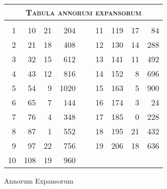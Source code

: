 %
\begin{tabnums} %
\normalsize
\centering
\setlength{\tabcolsep}{1.0ex}
%
\newcommand{\cwd}{3.2em}
\newcommand{\da}{{\scriptsize †}}
\newcommand{\db}{{\scriptsize ‡}}
\newcommand{\ang}{90}
\newcommand{\hsa}[1]{\scriptsize{#1}}
\newcommand{\hsb}[1]{\tiny{#1}}
\newcommand{\hdrA}{%
  ~ & ~ & \multicolumn{3}{c}{\hsa{Arabici}}
}
%
\newcommand{\hdrB}{%
  \ch{888}{\hsb{Anni Iuliani}}&
  \ch{888}{\hsb{Dies}} &
  \hsb{\ch{Horae}{Horae}} &
  \ch{8888}{\hsb{Scru\-puli}}
}
%
\newcommand{\hdrs}{%
 \hdrB & \hspace*{1em} & \hdrB \\
 \cmidrule{1-4} \cmidrule{6-9}
}
%
\begin{tabular}[c]{@{} rrrr c rrrr @{}}
\toprule
\multicolumn{9}{c}{\Large\textsc{Tabula annorum expansorum}} \\
\toprule
\hdrs %
  1 &  10 &  21 &  204 &~&  11 & 119 &  17 &  84 \\
  2 &  21 &  18 &  408 &~&  12 & 130 &  14 & 288 \\
  3 &  32 &  15 &  612 &~&  13 & 141 &  11 & 492 \\
  4 &  43 &  12 &  816 &~&  14 & 152 &   8 & 696 \\
  5 &  54 &   9 & 1020 &~&  15 & 163 &   5 & 900 \\
  6 &  65 &   7 &  144 &~&  16 & 174 &   3 &  24 \\
  7 &  76 &   4 &  348 &~&  17 & 185 &   0 & 228 \\
  8 &  87 &   1 &  552 &~&  18 & 195 &  21 & 432 \\
  9 &  97 &  22 &  756 &~&  19 & 206 &  18 & 636 \\
 10 & 108 &  19 &  960 &~&     &     &     &     \\
\bottomrule
\end{tabular}
\caption{Annorum Expansorum}
\label{tab:p141b}
\end{tabnums}

